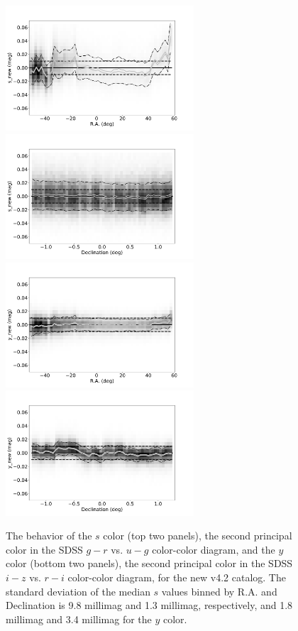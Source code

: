 \documentclass[fleqn,usenatbib]{mnras}
\begin{document}
\begin{figure}
    \centering\includegraphics[width=7cm]{figures/testV26vsV42_snew_u_s_new_RA_Hess.png}
    \centering\includegraphics[width=7cm]{figures/testV26vsV42_snew_u_s_new_Dec_Hess.png} 
    \centering\includegraphics[width=7cm]{figures/testV26vsV42_ynew_z_y_new_RA_Hess.png} 
    \centering\includegraphics[width=7cm]{figures/testV26vsV42_ynew_z_y_new_Dec_Hess.png}  
\caption{The behavior of the $s$ color (top two panels), the second principal color in the SDSS
$g-r$ vs. $u-g$ color-color diagram, and the $y$ color (bottom two panels), the second 
principal color in the SDSS $i-z$ vs. $r-i$ color-color diagram, for the new v4.2 catalog.
The standard deviation of the median $s$ values binned by R.A. and Declination is 9.8 millimag 
and 1.3 millimag, respectively, and 1.8 millimag and 3.4 millimag for the $y$ color.}
\label{fig:comparesy} 
\end{figure}
\end{document}
